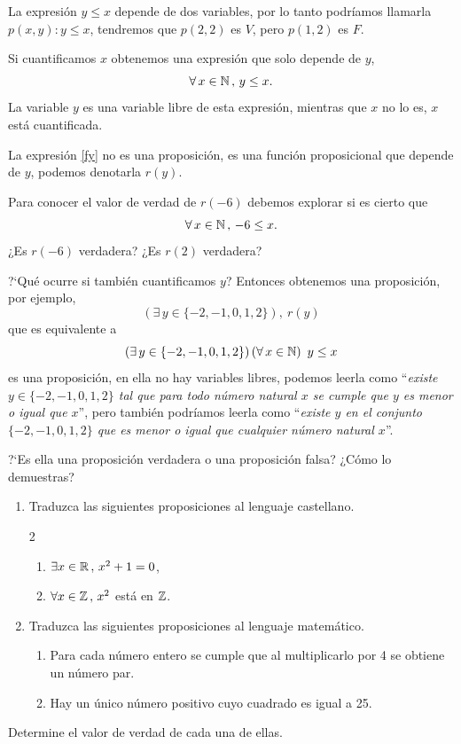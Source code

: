 \medskip 


\begin{ejemplo}
La expresi\'on $y\le x$ depende de dos variables, 
por lo tanto podríamos llamarla $p(x,y): y\le x$,
tendremos que $p(2,2)$ es $V$, pero $p(1,2)$ es $F$.

Si cuantificamos $x$ obtenemos una expresi\'on 
que solo depende de $y$,  
\begin{equation}\label{fy}
	\forall\,x\in \mathbb{N}\,,\, y\le x.
\end{equation}
La variable $y$ es una variable libre de esta expresi\'on, 
mientras que $x$ no lo es, $x$ está cuantificada.

La expresi\'on \eqref{fy} no es una proposici\'on, es una funci\'on proposicional
que depende de $y$, podemos denotarla $r(y)$.

Para conocer el valor de verdad de $r(-6)$ 
debemos explorar si es cierto que 
\[
	\forall\,x\in \mathbb{N}\,,\, -6 \le x.
\]
¿Es $r(-6)$ verdadera? 
¿Es $r(2)$ verdadera? 

?`Qu\'e ocurre si tambi\'en cuantificamos $y$? Entonces obtenemos una proposici\'on,
por ejemplo,
\[
	(\exists\, y\in \{-2,-1,0,1,2\}),\ r(y)
\]
que es equivalente a
\[
		\left(\exists\, y\in \{-2,-1,0,1,2\}\right)
		\left(\forall\,x \in \mathbb{N}\right)\ y \le x
\]
es una proposici\'on, en ella no hay variables libres, podemos leerla
como 
``{\em existe $y \in \{-2,-1,0,1,2\}$ tal que para todo n\'umero natural
$x$ se cumple que $y$ es menor o igual que $x$}'', pero
tambi\'en podr\'iamos leerla como 
``{\em existe $y$ en el conjunto $\{-2,-1,0,1,2\}$ que es menor o igual
que cualquier n\'umero natural $x$}''.

?`Es ella una proposici\'on
verdadera o una proposici\'on falsa? ¿C\'omo lo demuestras?
\end{ejemplo}


\begin{ejercicio}\leavevmode
\begin{enumerate}
\item Traduzca las siguientes proposiciones al lenguaje castellano.
\begin{multicols}{2}
\begin{enumerate}
	\item $\exists x\in \mathbb{R}\,,\, x^2+1=0$,							
	\item $\forall x \in \mathbb{Z}\,,\, x^2$ est\'a en $\mathbb{Z}$.
\end{enumerate}
\end{multicols}

\item Traduzca las siguientes proposiciones al lenguaje matemático.
\begin{enumerate}
\item Para cada número entero 
	se cumple que al multiplicarlo por 4 se obtiene un número par.
\item Hay un único número positivo cuyo cuadrado es igual a 25.
\end{enumerate}
\end{enumerate}
Determine el valor de verdad de cada una de ellas.
\end{ejercicio}

